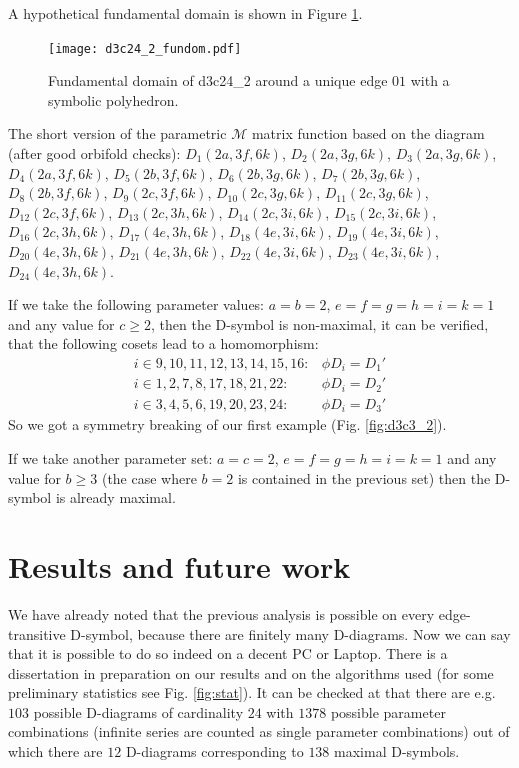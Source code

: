 \documentclass[12pt,a4paper]{article}
\numberwithin{equation}{section}
\theoremstyle{plain}%
\theoremstyle{definition}
\theoremstyle{remark}
\begin{document}
A hypothetical fundamental domain is shown in Figure \ref{fig:d3c24_2_fundom}.

\begin{figure}
  \caption{\label{fig:d3c24_2_fundom} Fundamental domain of d3c24\_2 around a
  unique edge $01$ with a symbolic polyhedron.}
  \center
  \texttt{[image: d3c24\_2\_fundom.pdf]}
\end{figure}

The short version of the parametric $\mathcal{M}$ matrix function based on the
diagram (after good orbifold checks): $D_1(2a, 3f, 6k)$, $D_2(2a, 3g, 6k)$,
$D_3(2a, 3g, 6k)$, $D_4(2a, 3f, 6k)$, $D_5(2b, 3f, 6k)$, $D_6(2b, 3g, 6k)$,
$D_7(2b, 3g, 6k)$, $D_8(2b, 3f, 6k)$, $D_9(2c, 3f, 6k)$, $D_{10}(2c, 3g, 6k)$,
$D_{11}(2c, 3g, 6k)$, $D_{12}(2c, 3f, 6k)$, $D_{13}(2c, 3h, 6k)$, $D_{14}(2c,
3i, 6k)$, $D_{15}(2c, 3i, 6k)$, $D_{16}(2c, 3h, 6k)$, $D_{17}(4e, 3h, 6k)$,
$D_{18}(4e, 3i, 6k)$, $D_{19}(4e, 3i, 6k)$, $D_{20}(4e, 3h, 6k)$, $D_{21}(4e,
3h, 6k)$, $D_{22}(4e, 3i, 6k)$, $D_{23}(4e, 3i, 6k)$, $D_{24}(4e, 3h, 6k)$.

If we take the following parameter values: $a=b=2$, $e=f=g=h=i=k=1$ and any value
for $c\geq2$, then the D-symbol is non-maximal, it can be verified, that the
following cosets lead to a homomorphism:
\begin{align}
  i\in{9,10,11,12,13,14,15,16}: & \phi{D_i}=D_1' \\
  i\in{1,2,7,8,17,18,21,22}: & \phi{D_i}=D_2' \\
  i\in{3,4,5,6,19,20,23,24}: & \phi{D_i}=D_3'
\end{align}
So we got a symmetry breaking of our first example (Fig. \ref{fig:d3c3_2}).

If we take another parameter set: $a=c=2$, $e=f=g=h=i=k=1$ and any value
for $b\geq3$ (the case where $b=2$ is contained in the previous set)
then the D-symbol is already maximal.

\section{Results and future work}
We have already noted that the previous analysis is possible on every
edge-transitive D-symbol, because there are finitely many D-diagrams. Now we can
say that it is possible to do so indeed on a decent PC or Laptop. There is a
dissertation in preparation on our results and on the algorithms used (for some
preliminary statistics see Fig. \ref{fig:stat}). It can be
checked at \cite{MYHOME_edge_trans} that there are e.g. $103$ possible
D-diagrams of cardinality $24$ with $1378$ possible parameter combinations
(infinite series are counted as single parameter combinations) out of which
there are $12$ D-diagrams corresponding to $138$ maximal D-symbols.
\end{document}
